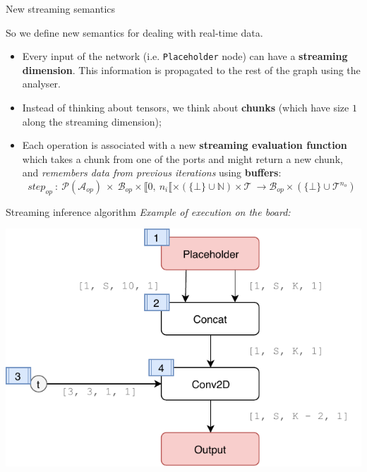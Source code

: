 \documentclass{beamer}
\begin{document}
\begin{frame}{New streaming semantics}
    \small

    \begin{block}{}
        So we define new semantics for dealing with real-time data.
    \end{block}

    \begin{itemize}
        \item<1-> Every input of the network (i.e. \texttt{Placeholder} node) can have a \textbf{streaming dimension}. This information is propagated to the rest of the graph using the analyser.
        \item<2-> Instead of thinking about tensors, we think about \textbf{chunks} (which have size $1$ along the streaming dimension);
        \item<3-> Each operation is associated with a new \textbf{streaming evaluation function} which takes a chunk from one of the ports and might return a new chunk, and \textit{remembers data from previous iterations} using \textbf{buffers}:
        $$step_{op} \ :\ \mathcal{P}(\mathcal{A}_{op})\ \times \ \mathcal{B}_{op} \times \llbracket 0,\ n_i \llbracket \times (\{\bot\} \cup \mathbb{N}) \times \mathcal{T} \ \rightarrow  \mathcal{B}_{op} \times (\{\bot\} \cup \mathcal{T}^{n_o})$$
    \end{itemize}
\end{frame}


\begin{frame}{Streaming inference algorithm}
    \textit{Example of execution on the board:}
    \vspace{1em}
    \begin{center}
        \includegraphics[width=.8\textwidth]{example-streaming.pdf}
    \end{center}
    
\end{frame}
\end{document}
